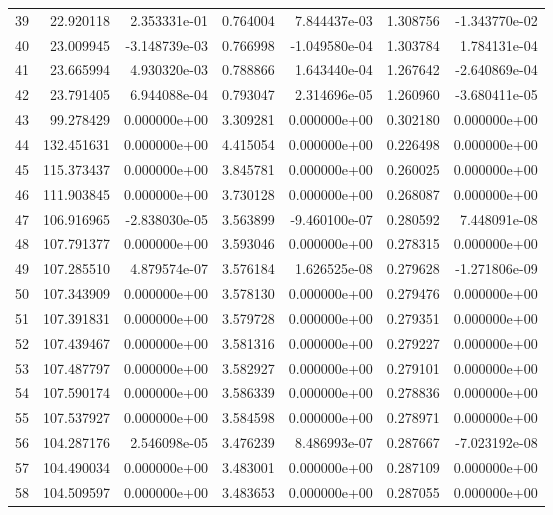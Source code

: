 \begin{tabular}{rrrrrrr}
39 &  22.920118 &  2.353331e-01 &  0.764004 &  7.844437e-03 &    1.308756 & -1.343770e-02 \\
40 &  23.009945 & -3.148739e-03 &  0.766998 & -1.049580e-04 &    1.303784 &  1.784131e-04 \\
41 &  23.665994 &  4.930320e-03 &  0.788866 &  1.643440e-04 &    1.267642 & -2.640869e-04 \\
42 &  23.791405 &  6.944088e-04 &  0.793047 &  2.314696e-05 &    1.260960 & -3.680411e-05 \\
43 &  99.278429 &  0.000000e+00 &  3.309281 &  0.000000e+00 &    0.302180 &  0.000000e+00 \\
44 & 132.451631 &  0.000000e+00 &  4.415054 &  0.000000e+00 &    0.226498 &  0.000000e+00 \\
45 & 115.373437 &  0.000000e+00 &  3.845781 &  0.000000e+00 &    0.260025 &  0.000000e+00 \\
46 & 111.903845 &  0.000000e+00 &  3.730128 &  0.000000e+00 &    0.268087 &  0.000000e+00 \\
47 & 106.916965 & -2.838030e-05 &  3.563899 & -9.460100e-07 &    0.280592 &  7.448091e-08 \\
48 & 107.791377 &  0.000000e+00 &  3.593046 &  0.000000e+00 &    0.278315 &  0.000000e+00 \\
49 & 107.285510 &  4.879574e-07 &  3.576184 &  1.626525e-08 &    0.279628 & -1.271806e-09 \\
50 & 107.343909 &  0.000000e+00 &  3.578130 &  0.000000e+00 &    0.279476 &  0.000000e+00 \\
51 & 107.391831 &  0.000000e+00 &  3.579728 &  0.000000e+00 &    0.279351 &  0.000000e+00 \\
52 & 107.439467 &  0.000000e+00 &  3.581316 &  0.000000e+00 &    0.279227 &  0.000000e+00 \\
53 & 107.487797 &  0.000000e+00 &  3.582927 &  0.000000e+00 &    0.279101 &  0.000000e+00 \\
54 & 107.590174 &  0.000000e+00 &  3.586339 &  0.000000e+00 &    0.278836 &  0.000000e+00 \\
55 & 107.537927 &  0.000000e+00 &  3.584598 &  0.000000e+00 &    0.278971 &  0.000000e+00 \\
56 & 104.287176 &  2.546098e-05 &  3.476239 &  8.486993e-07 &    0.287667 & -7.023192e-08 \\
57 & 104.490034 &  0.000000e+00 &  3.483001 &  0.000000e+00 &    0.287109 &  0.000000e+00 \\
58 & 104.509597 &  0.000000e+00 &  3.483653 &  0.000000e+00 &    0.287055 &  0.000000e+00 \\

\end{tabular}
